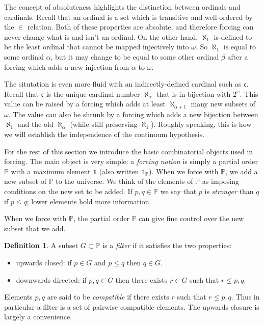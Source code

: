\documentclass[11pt,oneside,a4paper]{amsbook}
\newcommand{\PP}{\mathbb P}
\theoremstyle{definition}
\theoremstyle{plain}
\theoremstyle{definition}
\newtheorem{definition}[theorem]{Definition}
\theoremstyle{remark}
\numberwithin{equation}{section}
\numberwithin{figure}{section}
\begin{document}
The concept of absoluteness highlights the distinction between ordinals and cardinals. Recall that an ordinal is a set which is transitive and well-ordered by the $\in$ relation. Both of these properties are absolute, and therefore forcing can never change what is and isn't an ordinal. On the other hand, $\aleph_1$ is defined to be the least ordinal that cannot be mapped injectively into $\omega$. So $\aleph_1$ is equal to some ordinal $\alpha$, but it may change to be equal to some other ordinal $\beta$ after a forcing which adds a new injection from $\alpha$ to $\omega$.

The situtation is even more fluid with an indirectly-defined cardinal such as $\mathfrak c$. Recall that $\mathfrak c$ is the unique cardinal number $\aleph_\alpha$ that is in bijection with $2^\omega$. This value can be raised by a forcing which adds at least $\aleph_{\alpha+1}$ many new subsets of $\omega$. The value can also be shrunk by a forcing which adds a new bijection between $\aleph_1$ and the old $\aleph_\alpha$ (while still preserving $\aleph_1$). Roughly speaking, this is how we will establish the independence of the continuum hypothesis.

For the rest of this section we introduce the basic combinatorial objects used in forcing. The main object is very simple: a \emph{forcing notion} is simply a partial order $\PP$ with a maximum element $\mathbb1$ (also written $\mathbb1_\PP$). When we force with $\PP$, we add a new subset of $\PP$ to the universe. We think of the elements of $\PP$ as imposing conditions on the new set to be added. If $p,q\in\PP$ we say that $p$ is \emph{stronger} than $q$ if $p\leq q$; lower elements hold more information.

When we force with $\PP$, the partial order $\PP$ can give fine control over the new subset that we add.

\begin{definition}
  A subset $G\subset\PP$ is a \emph{filter} if it satisfies the two properties:
  \begin{itemize}
  \item upwards closed: if $p\in G$ and $p\leq q$ then $q\in G$.
  \item downwards directed: if $p,q\in G$ then there exists $r\in G$ such that $r\leq p,q$.
  \end{itemize}
\end{definition}

Elements $p,q$ are said to be \emph{compatible} if there exists $r$ such that $r\leq p,q$. Thus in particular a filter is a set of pairwise compatible elements. The upwards closure is largely a convenience.
\end{document}

